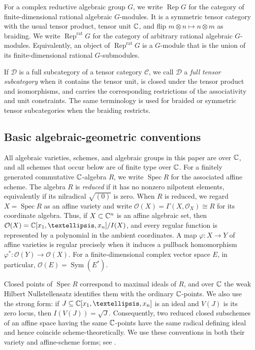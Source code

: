 \documentclass[10pt,a4paper]{amsart}
\numberwithin{equation}{section} \newtheorem{thm}{Theorem}[section] \newtheorem{lem}[thm]{Lemma} \newtheorem{ex}[thm]{Example} \newtheorem{prop}[thm]{Proposition} \newtheorem{cor}[thm]{Corollary} \newtheorem{defi}[thm]{Definition} \newtheorem{rmk}[thm]{Remark} \newtheorem{notation}[thm]{Notation}
\newcommand{\Rep}{\operatorname{Rep}}
\newcommand{\Sym}{\operatorname{Sym}}
\newcommand{\Spec}{\operatorname{Spec}}
\newcommand{\OO}{\mathcal O}
\begin{document}
For a complex reductive algebraic group $G$, we write $\Rep G$ for the category of finite-dimensional rational algebraic $G$-modules. It is a symmetric tensor category with the usual tensor product, tensor unit $\mathbb{C}$, and flip \(m\otimes n\longmapsto n\otimes m\) as braiding. We write $\Rep^{\mathrm{rat}}G$ for the category of arbitrary rational algebraic $G$-modules. Equivalently, an object of $\Rep^{\mathrm{rat}}G$ is a $G$-module that is the union of its finite-dimensional rational $G$-submodules.

If $\mathcal D$ is a full subcategory of a tensor category $\mathcal C$, we call $\mathcal D$ a \emph{full tensor subcategory} when it contains the tensor unit, is closed under the tensor product and isomorphisms, and carries the corresponding restrictions of the associativity and unit constraints. The same terminology is used for braided or symmetric tensor subcategories when the braiding restricts.

\subsection{Basic algebraic-geometric conventions}
\label{subsec:AG-conventions}

All algebraic varieties, schemes, and algebraic groups in this paper are over $\mathbb{C}$, and all schemes that occur below are of finite type over $\mathbb{C}$. For a finitely generated commutative $\mathbb{C}$-algebra $R$, we write $\Spec R$ for the associated affine scheme. The algebra $R$ is \emph{reduced} if it has no nonzero nilpotent elements, equivalently if its nilradical $\sqrt{(0)}$ is zero. When $R$ is reduced, we regard $X=\Spec R$ as an affine variety and write $\OO(X)=\Gamma(X,\mathcal O_X)\cong R$ for its coordinate algebra. Thus, if $X\subset\mathbb{C}^n$ is an affine algebraic set, then $\OO(X)=\C[x_1,\ldots,x_n]/I(X)$, and every regular function is represented by a polynomial in the ambient coordinates. A map $\varphi:X\to Y$ of affine varieties is regular precisely when it induces a pullback homomorphism $\varphi^*:\OO(Y)\to\OO(X)$. For a finite-dimensional complex vector space $E$, in particular, $\OO(E)=\Sym(E^*)$.

Closed points of $\Spec R$ correspond to maximal ideals of $R$, and over $\mathbb{C}$ the weak Hilbert Nullstellensatz identifies them with the ordinary $\mathbb{C}$-points. We also use the strong form: if $J\subseteq\C[x_1,\ldots,x_n]$ is an ideal and $V(J)$ is its zero locus, then \(I(V(J))=\sqrt J.\) Consequently, two reduced closed subschemes of an affine space having the same $\mathbb{C}$-points have the same radical defining ideal and hence coincide scheme-theoretically. We use these conventions in both their variety and affine-scheme forms; see \cite[Chapters~I--II]{Hartshorne}.
\end{document}

